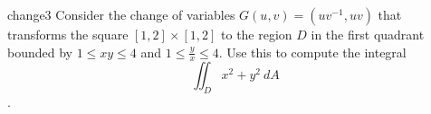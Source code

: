 \begin{problem}{change3}
    Consider the change of variables $G(u,v) = (uv^{-1}, uv)$ that transforms the square $[1,2]\times[1,2]$ to the region $D$ in the first quadrant bounded by $1 \leq xy \leq 4$ and $1 \leq \frac{y}{x} \leq 4$. Use this to compute the integral $$\iint_D x^2+y^2 \ dA$$.
\end{problem}